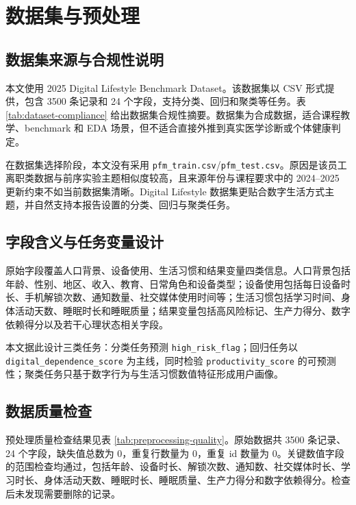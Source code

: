 \chapter{数据集与预处理}

\section{数据集来源与合规性说明}

本文使用 2025 Digital Lifestyle Benchmark Dataset。该数据集以 CSV 形式提供，包含 3500 条记录和 24 个字段，支持分类、回归和聚类等任务。表 \ref{tab:dataset-compliance} 给出数据集合规性摘要。数据集为合成数据，适合课程教学、benchmark 和 EDA 场景，但不适合直接外推到真实医学诊断或个体健康判定。



在数据集选择阶段，本文没有采用 \texttt{pfm\_train.csv}/\texttt{pfm\_test.csv}。原因是该员工离职类数据与前序实验主题相似度较高，且来源年份与课程要求中的 2024--2025 更新约束不如当前数据集清晰。Digital Lifestyle 数据集更贴合数字生活方式主题，并自然支持本报告设置的分类、回归与聚类任务。

\section{字段含义与任务变量设计}

原始字段覆盖人口背景、设备使用、生活习惯和结果变量四类信息。人口背景包括年龄、性别、地区、收入、教育、日常角色和设备类型；设备使用包括每日设备时长、手机解锁次数、通知数量、社交媒体使用时间等；生活习惯包括学习时间、身体活动天数、睡眠时长和睡眠质量；结果变量包括高风险标记、生产力得分、数字依赖得分以及若干心理状态相关字段。

本文据此设计三类任务：分类任务预测 \texttt{high\_risk\_flag}；回归任务以 \texttt{digital\_dependence\_score} 为主线，同时检验 \texttt{productivity\_score} 的可预测性；聚类任务只基于数字行为与生活习惯数值特征形成用户画像。

\section{数据质量检查}

预处理质量检查结果见表 \ref{tab:preprocessing-quality}。原始数据共 3500 条记录、24 个字段，缺失值总数为 0，重复行数量为 0，重复 id 数量为 0。关键数值字段的范围检查均通过，包括年龄、设备时长、解锁次数、通知数、社交媒体时长、学习时长、身体活动天数、睡眠时长、睡眠质量、生产力得分和数字依赖得分。检查后未发现需要删除的记录。

